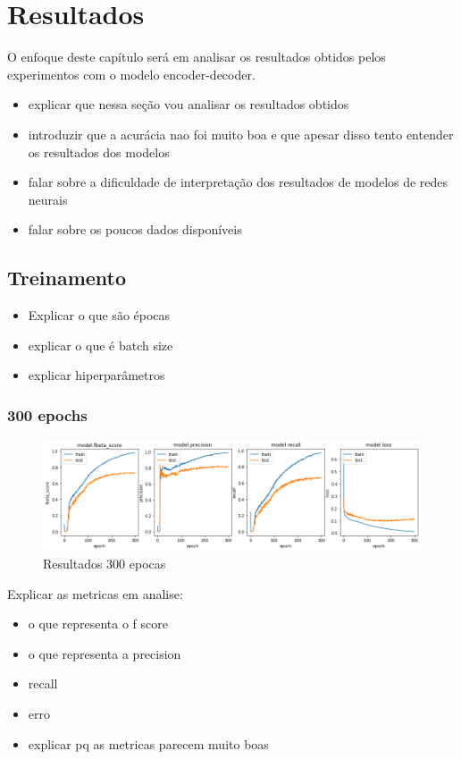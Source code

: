 \chapter{Resultados}
\label{ch:07}

O enfoque deste capítulo será em analisar os resultados obtidos pelos experimentos com o modelo encoder-decoder.   

\begin{itemize}
    \item explicar que nessa seção vou analisar os resultados obtidos
    \item introduzir que a acurácia nao foi muito boa e que apesar disso tento entender os resultados dos modelos
    \item falar sobre a dificuldade de interpretação dos resultados de modelos de redes neurais
    \item falar sobre os poucos dados disponíveis%
\end{itemize}

\section{Treinamento}

\begin{itemize}
    \item Explicar o que são épocas
    \item explicar o que é batch size
    \item explicar hiperparâmetros
\end{itemize}
\subsection{300 epochs}
\begin{figure}[H]
  \centering
  \includegraphics[width=1.0\linewidth]{img/300_fbeta.png}
  \caption{Resultados 300 epocas}
  \label{fig:training}
\end{figure}

Explicar as metricas em analise:
\begin{itemize}
    \item o que representa o f score
    \item o que representa a precision
    \item recall
    \item erro
    \item explicar pq as metricas parecem muito boas
\end{itemize}
